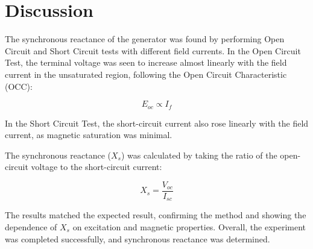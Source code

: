 \documentclass[a4paper,12pt]{article}
\begin{document}
\section{Discussion}
		
		
		The synchronous reactance of the generator was found by performing Open Circuit and Short Circuit tests with different field currents. In the Open Circuit Test, the terminal voltage was seen to increase almost linearly with the field current in the unsaturated region, following the Open Circuit Characteristic (OCC):
		
		\[
		E_{oc} \propto I_f
		\]
		
		In the Short Circuit Test, the short-circuit current also rose linearly with the field current, as magnetic saturation was minimal.
		
		The synchronous reactance ($X_s$) was calculated by taking the ratio of the open-circuit voltage to the short-circuit current:
		
		\[
		X_s = \frac{V_{oc}}{I_{sc}}
		\]
		
		The results matched the expected result, confirming the method and showing the dependence of $X_s$ on excitation and magnetic properties. Overall, the experiment was completed successfully, and synchronous reactance was determined.
		
\end{document}
